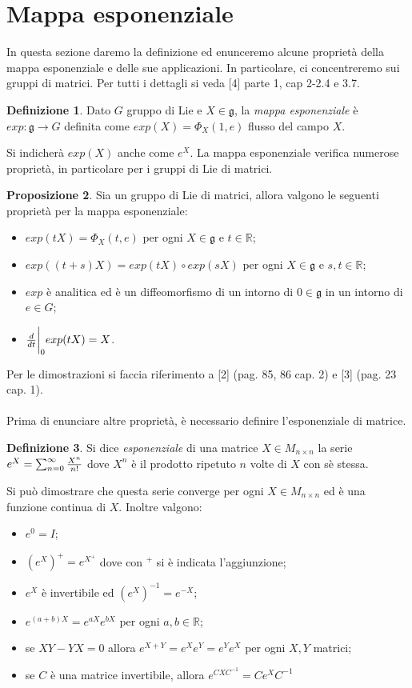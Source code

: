 \documentclass[12pt,a4paper]{report}
\theoremstyle{definition}
\newtheorem{Def}{Definizione}[chapter]
\theoremstyle{Theorem}
\newtheorem{Prop}[Def]{Proposizione}
\theoremstyle{definition}
\theoremstyle{definition}
\theoremstyle{definition}
\begin{document}
\section{Mappa esponenziale}
In questa sezione daremo la definizione ed enunceremo alcune proprietà della mappa esponenziale e delle sue applicazioni. In particolare, ci concentreremo sui gruppi di matrici. Per tutti i dettagli si veda [4] parte 1, cap 2-2.4 e 3.7.
\begin{Def}
	Dato $G$ gruppo di Lie e $X\in\mathfrak{g}$, la \textit{mappa esponenziale} è \\$exp:\mathfrak{g}\rightarrow G$ definita come $exp(X)=\Phi_X(1,e)$ flusso del campo $X$.
\end{Def}
Si indicherà $exp(X)$ anche come $e^X$.
La mappa esponenziale verifica numerose proprietà, in particolare per i gruppi di Lie di matrici.
\begin{Prop}
	Sia un gruppo di Lie di matrici, allora valgono le seguenti proprietà per la mappa esponenziale:\begin{itemize}
		\item $exp(tX)=\Phi_X(t,e)$ per ogni $X\in \mathfrak{g}$ e $t\in \mathbb{R}$;
		\item $exp((t+s)X)=exp(tX)\circ exp(sX)$ per ogni $X\in \mathfrak{g}$ e $s,t\in\mathbb{R}$;
		\item $exp$ è analitica ed è un diffeomorfismo di un intorno di $0\in\mathfrak{g}$ in un intorno di $e\in G$;
		\item ${d\over dt}\bigg{\rvert}_0exp(tX)=X$. 
	\end{itemize}
\end{Prop}
Per le dimostrazioni si faccia riferimento a [2] (pag. 85, 86 cap. 2) e [3] (pag. 23 cap. 1).\\
\\
Prima di enunciare altre proprietà, è necessario definire l'esponenziale di matrice.
\begin{Def}
	Si dice \textit{esponenziale} di una matrice $X\in M_{n\times n}$ la serie \\$e^X=\sum_{n=0}^{\infty}{X^n\over n! }$ dove $X^n$ è il prodotto ripetuto $n$ volte di $X$ con sè stessa.
\end{Def}
Si può dimostrare che questa serie converge per ogni $X\in M_{n\times n}$ ed è una funzione continua di $X$. Inoltre valgono:\begin{itemize}
	\item $e^0=I$;
	\item $(e^X)^+=e^{X^+}$ dove con $^+$ si è indicata l'aggiunzione;
	\item $e^X$ è invertibile ed $(e^X)^{-1}=e^{-X}$;
	\item $e^{(a+b)X}=e^{aX}e^{bX}$ per ogni $a,b\in\mathbb{R}$;
	\item se $XY-YX=0$ allora $e^{X+Y}=e^Xe^Y=e^Ye^X$ per ogni $X,Y$ matrici;\\
	\item se $C$ è una matrice invertibile, allora $e^{CXC^{-1}}=Ce^XC^{-1}$
\end{itemize} 
\end{document}

